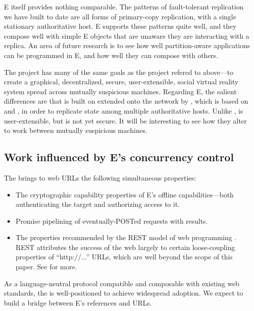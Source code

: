 \documentclass{llncs}
\begin{document}
E itself provides nothing comparable. The patterns of fault-tolerant
replication we have built to date are all forms of primary-copy
replication, with a single stationary authoritative host. E supports
these patterns quite well, and they compose well with simple E objects
that are unaware they are interacting with a replica. An area of
future research is to see how well partition-aware applications can be
programmed in E, and how well they can compose with others.

 The  project has
many of the same goals as the  project refered to
above---to create a graphical, decentralized, secure, user-extensible,
social virtual reality system spread across mutually suspicious
machines. Regarding E, the salient differences are that 
is built on  extended onto the network by
, which is based on  \cite{reed:namos} and
 \cite{lamport:paxos}, in order to replicate state among
multiple authoritative hosts. Unlike ,  is
user-extensible, but is not yet secure. It will be interesting to see
how they alter  to work between mutually suspicious
machines.

\subsection{Work influenced by E's concurrency control}

 The  \cite{tyler:webcalc}
brings to web URLs the following simultaneous properties:
%
\begin{itemize}
\item The cryptographic capability properties of E's offline
  capabilities---both authenticating the target and authorizing access
  to it.
\item Promise pipelining of eventually-POSTed requests with results.
\item The properties recommended by the REST model of web programming
  \cite{fielding:rest}. REST attributes the success of the web largely
  to certain loose-coupling properties of ``http://...''  URLs, which
  are well beyond the scope of this paper. See
  \cite{fielding:rest,tyler:webcalc} for more.
\end{itemize}
%
As a language-neutral protocol compatible and composable with existing
web standards, the  is well-positioned 
to achieve widespread adoption. We expect to build a bridge between
E's references and  URLs.
\end{document}

